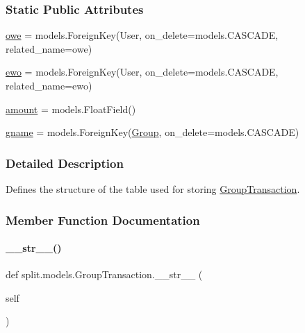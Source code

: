 \subsubsection*{Static Public Attributes}
\begin{DoxyCompactItemize}
\item 
\hyperlink{classsplit_1_1models_1_1GroupTransaction_a0bbc00c7501cab8540c3af179b07ea08}{owe} = models.\+Foreign\+Key(User, on\+\_\+delete=models.\+C\+A\+S\+C\+A\+DE, related\+\_\+name=\textquotesingle{}owe\textquotesingle{})
\item 
\hyperlink{classsplit_1_1models_1_1GroupTransaction_a1abbf884cef0569c755f0400289227d4}{ewo} = models.\+Foreign\+Key(User, on\+\_\+delete=models.\+C\+A\+S\+C\+A\+DE, related\+\_\+name=\textquotesingle{}ewo\textquotesingle{})
\item 
\hyperlink{classsplit_1_1models_1_1GroupTransaction_a7e632cc1455b034cce3b25549b970ed5}{amount} = models.\+Float\+Field()
\item 
\hyperlink{classsplit_1_1models_1_1GroupTransaction_a409102962bbb485e924d07f922271409}{gname} = models.\+Foreign\+Key(\hyperlink{classsplit_1_1models_1_1Group}{Group}, on\+\_\+delete=models.\+C\+A\+S\+C\+A\+DE)
\end{DoxyCompactItemize}


\subsubsection{Detailed Description}
Defines the structure of the table used for storing \hyperlink{classsplit_1_1models_1_1GroupTransaction}{Group\+Transaction}. 

\subsubsection{Member Function Documentation}
\mbox{\label{classsplit_1_1models_1_1GroupTransaction_ab2fdfa9cdc899dbb3296e06e16e217fd}} 
\paragraph{\texorpdfstring{\+\_\+\+\_\+str\+\_\+\+\_\+()}{\_\_str\_\_()}}
{\footnotesize\ttfamily def split.\+models.\+Group\+Transaction.\+\_\+\+\_\+str\+\_\+\+\_\+ (\begin{DoxyParamCaption}\item[{}]{self }\end{DoxyParamCaption})}



